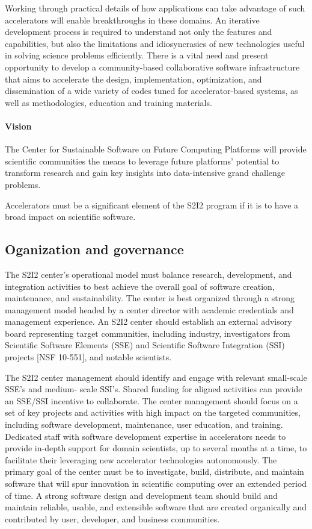 Working through practical details of how applications can take advantage of such accelerators will enable breakthroughs in these domains. An iterative development process is required to understand not only the features and capabilities, but also the limitations and idiosyncrasies of new technologies useful in solving science problems efficiently. There is a vital need and present opportunity to develop a community-based collaborative software infrastructure that aims to accelerate the design, implementation, optimization, and dissemination of a wide variety of codes tuned for accelerator-based systems, as well as methodologies, education and training materials.

\paragraph{Vision} The Center for Sustainable Software on Future Computing Platforms will provide scientific communities the means to leverage future platforms’ potential to transform research and gain key insights into data-intensive grand challenge problems.


Accelerators must be a significant element of the S2I2 program if it is to have a broad impact on scientific software.

\subsection{Oganization and governance}
The S2I2 center’s operational model must balance research, development, and integration activities to best achieve the overall goal of software creation, maintenance, and sustainability. The center is best organized through a strong management model headed by a center director with academic credentials and management experience. An S2I2 center should establish an external advisory board representing target communities, including industry, investigators from Scientific Software Elements (SSE) and Scientific Software Integration (SSI) projects [NSF 10-551], and notable scientists.

The S2I2 center management should identify and engage with relevant small-scale SSE’s and medium- scale SSI’s. Shared funding for aligned activities can provide an SSE/SSI incentive to collaborate. The center management should focus on a set of key projects and activities with high impact on the targeted communities, including software development, maintenance, user education, and training. Dedicated staff with software development expertise in accelerators needs to provide in-depth support for domain scientists, up to several months at a time, to facilitate their leveraging new accelerator technologies autonomously.
The primary goal of the center must be to investigate, build, distribute, and maintain software that will spur innovation in scientific computing over an extended period of time. A strong software design and development team should build and maintain reliable, usable, and extensible software that are created organically and contributed by user, developer, and business communities.

